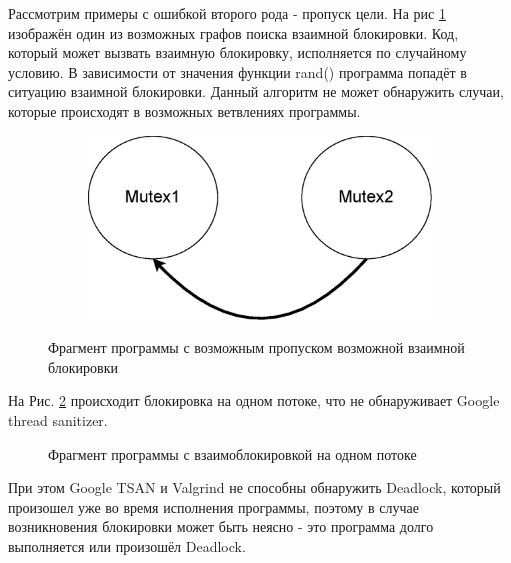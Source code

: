 Рассмотрим примеры с ошибкой второго рода - пропуск цели. На рис \ref{fig:2m2t-du} изображён один из возможных графов поиска взаимной блокировки. Код, который может вызвать взаимную блокировку, исполняется по случайному условию. В зависимости от значения функции rand() программа попадёт в ситуацию взаимной блокировки. Данный алгоритм не может обнаружить случаи, которые происходят в возможных ветвлениях программы.


\begin{figure}[htbp]
    \centering
    \begin{subfigure}[h]{0.4\textwidth}
        \centering
        
    \end{subfigure}
    \hfill
    \begin{subfigure}[h]{0.4\textwidth}
        \centering
        \includegraphics[width=\textwidth]{inc/chapter-first/2m2t-du.eps}
    \end{subfigure}
    \caption{Фрагмент программы с возможным пропуском возможной взаимной блокировки}
    \label{fig:2m2t-du}
\end{figure}

На Рис. \ref{fig:1m1t-d} происходит блокировка на одном потоке, что не обнаруживает Google thread sanitizer.

\begin{figure}[htbp]

 \caption{Фрагмент программы с взаимоблокировкой на одном потоке}
 \label{fig:1m1t-d}
\end{figure}

При этом Google TSAN и Valgrind не способны обнаружить Deadlock, который произошел уже во время исполнения программы, поэтому в случае возникновения блокировки может быть неясно - это программа долго выполняется или произошёл Deadlock.

